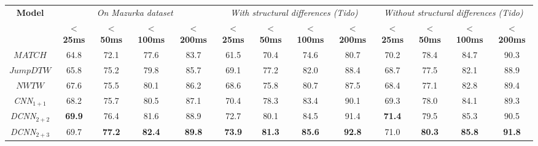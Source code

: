 \documentclass{article}
\begin{document}
\begin{table*}[th]
  \vspace*{-0.6cm}
  \begin{adjustbox}{max width=\textwidth}
\begin{tabular}{ccccccccccccc}
\toprule
\hline 
\multirow{2}{*}{\textbf{Model}} & 
\multicolumn{4}{c}{\textit{On Mazurka dataset}}  
& \multicolumn{4}{c}{\textit{With structural differences (Tido)}} & \multicolumn{4}{c}{\textit{Without structural differences (Tido)}}
\tabularnewline
  & \textbf{$<$25ms}& \textbf{$<$50ms} & \textbf{$<$100ms} & \textbf{$<$200ms} & \textbf{$<$25ms} &\textbf{$<$50ms} & \textbf{$<$100ms} & \textbf{$<$200ms}
  &
  \textbf{$<$25ms} &
  \textbf{$<$50ms} & \textbf{$<$100ms} & \textbf{$<$200ms}
  \\
\midrule 
 \begin{math}\textit{MATCH}\end{math}\cite{dixon2005line} & 64.8 & 72.1 & 77.6 & 83.7 & 61.5 & 70.4 & 74.6 & 80.7 & 70.2 & 78.4 & 84.7 & 90.3  \\
\midrule
 \begin{math}\textit{JumpDTW}\end{math} \cite{Fremerey2010handling} & 65.8 & 75.2 & 79.8 & 85.7 & 69.1 & 77.2 & 82.0 & 88.4 & 68.7 & 77.5 & 82.1 & 88.9  \\
\midrule 
 \begin{math}\textit{NWTW}\end{math} \cite{grachten2013automatic} & 67.6 & 75.5 & 80.1 & 86.2 & 68.6 & 75.8 & 80.7 & 87.5 & 68.4 & 77.1 & 82.8 & 89.4  \\
\midrule 
     \emph{CNN}${}_{1+1}$ & 68.2 & 75.7 & 80.5 & 87.1   & 70.4 & 78.3 & 83.4 & 90.1 & 69.3 & 78.0 & 84.1 & 89.3 \\
\midrule 
      \emph{DCNN}${}_{2+2}$ & \textbf{69.9} & 76.4 & 81.6 & 88.9 & 72.7 & 80.1  & 84.5 & 91.4 & \textbf{71.4} & 79.5 & 85.3 & 90.5 \\
\midrule 
    \emph{DCNN}${}_{2+3}$ & 69.7 & \textbf{77.2} & \textbf{82.4} & \textbf{89.8} & \textbf{73.9} & \textbf{81.3} & \textbf{85.6} & \textbf{92.8} & 71.0 & \textbf{80.3} & \textbf{85.8} & \textbf{91.8} \\

\end{tabular}
\end{adjustbox}
\end{table*}
\end{document}
